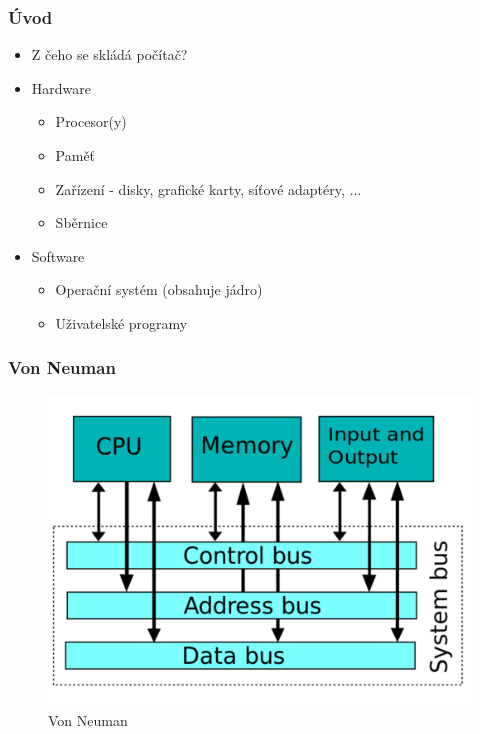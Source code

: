 \documentclass[professionalfonts,svgnames]{beamer}
\begin{document}
\begin{frame}
\frametitle{Úvod}
\begin{itemize}
	\item Z čeho se skládá počítač?
	\item Hardware
		\begin{itemize}
			\item Procesor(y)
			\item Paměť
			\item Zařízení - disky, grafické karty, síťové adaptéry, ...
			\item Sběrnice
		\end{itemize}
	\item Software
		\begin{itemize}
			\item Operační systém (obsahuje jádro)
			\item Uživatelské programy
		\end{itemize}
\end{itemize}
\end{frame}

\begin{frame}
\frametitle{Von Neuman}
\begin{figure}[h]
	\includegraphics[scale=0.4]{fig/von_neuman}
	\caption{Von Neuman}
	\label{vn}
\end{figure}
\end{frame}
\end{document}
